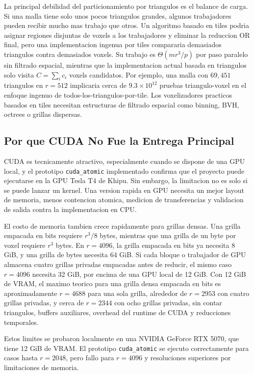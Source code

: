 \documentclass[conference]{IEEEtran}
\begin{document}
La principal debilidad del particionamiento por triangulos es el balance de
carga. Si una malla tiene solo unos pocos triangulos grandes, algunos
trabajadores pueden recibir mucho mas trabajo que otros. Un algoritmo basado en
tiles podria asignar regiones disjuntas de voxels a los trabajadores y eliminar
la reduccion OR final, pero una implementacion ingenua por tiles compararia
demasiados triangulos contra demasiados voxels. Su trabajo es
$\Theta(mr^3/p)$ por paso paralelo sin filtrado espacial, mientras que la
implementacion actual basada en triangulos solo visita
$C=\sum_i c_i$ voxels candidatos. Por ejemplo, una malla con $69{,}451$
triangulos en $r=512$ implicaria cerca de $9.3\times10^{12}$ pruebas
triangulo-voxel en el enfoque ingenuo de todos-los-triangulos-por-tile. Los
voxelizadores practicos basados en tiles necesitan estructuras de filtrado
espacial como binning, BVH, octrees o grillas dispersas.

\subsection{Por que CUDA No Fue la Entrega Principal}

CUDA es tecnicamente atractivo, especialmente cuando se dispone de una GPU local,
y el prototipo \texttt{cuda\_atomic} implementado confirma que el proyecto puede
ejecutarse en la GPU Tesla T4 de Khipu. Sin embargo, la limitacion no es solo si
se puede lanzar un kernel. Una version rapida en GPU necesita un mejor layout de
memoria, menos contencion atomica, medicion de transferencias y validacion de
salida contra la implementacion en CPU.

El costo de memoria tambien crece rapidamente para grillas densas. Una grilla
empacada en bits requiere $r^3/8$ bytes, mientras que una grilla de un byte por
voxel requiere $r^3$ bytes. En $r=4096$, la grilla empacada en bits ya necesita
8 GiB, y una grilla de bytes necesita 64 GiB. Si cada bloque o trabajador de GPU
almacena cuatro grillas privadas empacadas antes de reducir, el mismo caso
$r=4096$ necesita 32 GiB, por encima de una GPU local de 12 GiB. Con 12 GiB de
VRAM, el maximo teorico para una grilla densa empacada en bits es
aproximadamente $r=4688$ para una sola grilla, alrededor de $r=2953$ con cuatro
grillas privadas, y cerca de $r=2344$ con ocho grillas privadas, sin contar
triangulos, buffers auxiliares, overhead del runtime de CUDA y reducciones
temporales.

Estos limites se probaron localmente en una NVIDIA GeForce RTX 5070, que tiene
12 GiB de VRAM. El prototipo \texttt{cuda\_atomic} se ejecuto correctamente para
casos hasta $r=2048$, pero fallo para $r=4096$ y resoluciones superiores por
limitaciones de memoria.
\end{document}
